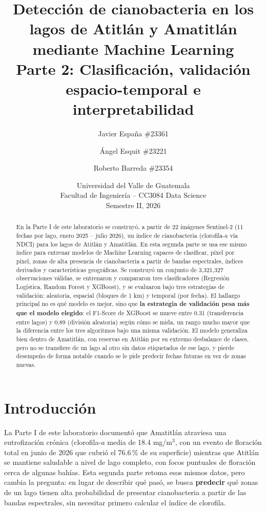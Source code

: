 \documentclass[11pt]{article}
\title{\vspace{-1.5cm}\textbf{Detección de cianobacteria en los lagos de Atitlán y Amatitlán mediante Machine Learning}\\
\large Parte 2: Clasificación, validación espacio-temporal e interpretabilidad}
\author{
  Javier España \#23361 \and
  Ángel Esquit \#23221 \and
  Roberto Barreda \#23354
}
\date{Universidad del Valle de Guatemala \\ Facultad de Ingeniería -- CC3084 Data Science \\ Semestre II, 2026}
\begin{document}
\maketitle
\thispagestyle{empty}

\begin{abstract}
\noindent En la Parte I de este laboratorio se construyó, a partir de 22 imágenes Sentinel-2 (11 fechas por lago, enero 2025 -- julio 2026), un índice de cianobacteria (clorofila-\(a\) vía NDCI) para los lagos de Atitlán y Amatitlán. En esta segunda parte se usa ese mismo índice para entrenar modelos de Machine Learning capaces de clasificar, píxel por píxel, zonas de alta presencia de cianobacteria a partir de bandas espectrales, índices derivados y características geográficas. Se construyó un conjunto de 3{,}321{,}327 observaciones válidas, se entrenaron y compararon tres clasificadores (Regresión Logística, Random Forest y XGBoost), y se evaluaron bajo tres estrategias de validación: aleatoria, espacial (bloques de 1 km) y temporal (por fecha). El hallazgo principal no es qué modelo es mejor, sino que \textbf{la estrategia de validación pesa más que el modelo elegido}: el F1-Score de XGBoost se mueve entre 0.31 (transferencia entre lagos) y 0.89 (división aleatoria) según cómo se mida, un rango mucho mayor que la diferencia entre los tres algoritmos bajo una misma validación. El modelo generaliza bien dentro de Amatitlán, con reservas en Atitlán por su extremo desbalance de clases, pero no se transfiere de un lago al otro sin datos etiquetados de ese lago, y pierde desempeño de forma notable cuando se le pide predecir fechas futuras en vez de zonas nuevas.
\end{abstract}

\tableofcontents

\section{Introducción}

La Parte I de este laboratorio documentó que Amatitlán atraviesa una eutrofización crónica (clorofila-\(a\) media de 18.4 mg/m\(^3\), con un evento de floración total en junio de 2026 que cubrió el 76.6\,\% de su superficie) mientras que Atitlán se mantiene saludable a nivel de lago completo, con focos puntuales de floración cerca de algunas bahías. Esta segunda parte retoma esos mismos datos, pero cambia la pregunta: en lugar de describir qué pasó, se busca \textbf{predecir} qué zonas de un lago tienen alta probabilidad de presentar cianobacteria a partir de las bandas espectrales, sin necesitar primero calcular el índice de clorofila.
\end{document}
